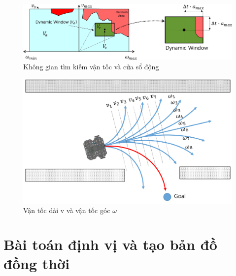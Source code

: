 {{\begin{figure}[htbp]
  \centering
  \includegraphics[width=1\linewidth]{figures/DWA.png}
  \caption{Không gian tìm kiếm vận tốc và cửa sổ động}
  \label{fig:dwa}
\end{figure}

\begin{figure}[htbp]
  \centering
  \includegraphics[width=0.8\linewidth]{figures/dwa-search-velocity.png}
  \caption{Vận tốc dài v và vận tốc góc $\omega$}
  \label{fig:dwa-search-velocity}
\end{figure}

\section{Bài toán định vị và tạo bản đồ đồng thời}



}}
